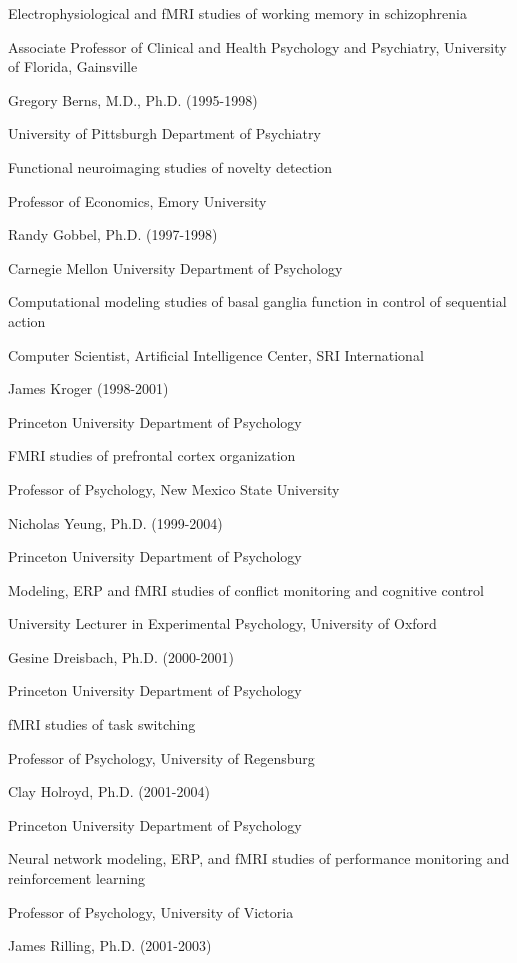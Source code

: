 \documentclass[10 pt]{article}
\begin{document}
Electrophysiological and fMRI studies of working memory in schizophrenia

Associate Professor of Clinical and Health Psychology and Psychiatry, University of Florida, Gainsville
    \medskip

Gregory Berns, M.D., Ph.D. (1995-1998)

University of Pittsburgh Department of Psychiatry

Functional neuroimaging studies of novelty detection

Professor of Economics, Emory University
    \medskip

Randy Gobbel, Ph.D. (1997-1998)

Carnegie Mellon University Department of Psychology

Computational modeling studies of basal ganglia function in control of sequential action

Computer Scientist, Artificial Intelligence Center, SRI International
    \medskip

James Kroger (1998-2001)

Princeton University Department of Psychology

FMRI studies of prefrontal cortex organization

Professor of Psychology, New Mexico State University
    \medskip

Nicholas Yeung, Ph.D. (1999-2004)

Princeton University Department of Psychology

Modeling, ERP and fMRI studies of conflict monitoring and cognitive control

University Lecturer in Experimental Psychology, University of Oxford
    \medskip

Gesine Dreisbach, Ph.D. (2000-2001)

Princeton University Department of Psychology

fMRI studies of task switching

Professor of Psychology, University of Regensburg
    \medskip

Clay Holroyd, Ph.D. (2001-2004)

Princeton University Department of Psychology

Neural network modeling, ERP, and fMRI studies of performance monitoring and reinforcement learning

Professor of Psychology, University of Victoria
    \medskip

James Rilling, Ph.D. (2001-2003)
\end{document}
